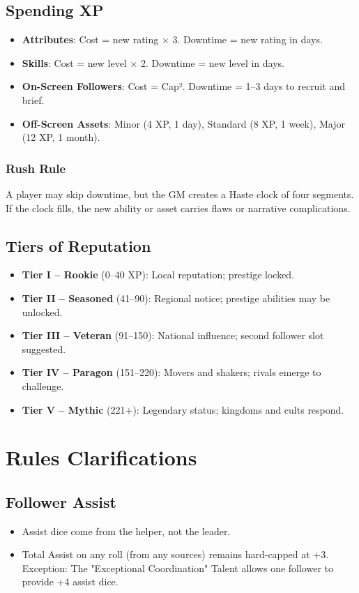 \documentclass[11pt]{article}
\begin{document}
\subsection{Spending XP}
\begin{itemize}
    \item \textbf{Attributes}: Cost = new rating × 3. Downtime = new rating in days.
    \item \textbf{Skills}: Cost = new level × 2. Downtime = new level in days.
    \item \textbf{On-Screen Followers}: Cost = Cap². Downtime = 1–3 days to recruit and brief.
    \item \textbf{Off-Screen Assets}: Minor (4 XP, 1 day), Standard (8 XP, 1 week), Major (12 XP, 1 month).
\end{itemize}

\subsubsection{Rush Rule}
A player may skip downtime, but the GM creates a Haste clock of four segments. If the clock fills, the new ability or asset carries flaws or narrative complications.

\subsection{Tiers of Reputation}
\begin{itemize}
    \item \textbf{Tier I – Rookie} (0–40 XP): Local reputation; prestige locked.
    \item \textbf{Tier II – Seasoned} (41–90): Regional notice; prestige abilities may be unlocked.
    \item \textbf{Tier III – Veteran} (91–150): National influence; second follower slot suggested.
    \item \textbf{Tier IV – Paragon} (151–220): Movers and shakers; rivals emerge to challenge.
    \item \textbf{Tier V – Mythic} (221+): Legendary status; kingdoms and cults respond.
\end{itemize}

\section{Rules Clarifications}

\subsection{Follower Assist}
\begin{itemize}
    \item Assist dice come from the helper, not the leader.
    \item Total Assist on any roll (from any sources) remains hard-capped at +3. Exception: The "Exceptional Coordination" Talent allows one follower to provide +4 assist dice.
\end{itemize}
\end{document}
